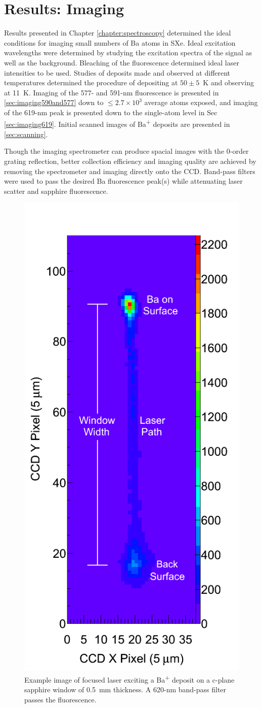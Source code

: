 \chapter{Results: Imaging}
\label{chapter:imaging}


Results presented in Chapter \ref{chapter:spectroscopy} determined the ideal conditions for imaging small numbers of Ba atoms in SXe.  Ideal excitation wavelengths were determined by studying the excitation spectra of the signal as well as the background.  Bleaching of the fluorescence determined ideal laser intensities to be used.  Studies of deposits made and observed at different temperatures determined the procedure of depositing at $50 \pm 5$~K and observing at 11~K.  Imaging of the 577- and 591-nm fluorescence is presented in \ref{sec:imaging590and577} down to $\leq 2.7 \times 10^{3}$ average atoms exposed, and imaging of the 619-nm peak is presented down to the single-atom level in Sec \ref{sec:imaging619}.  Initial scanned images of Ba\textsuperscript{+} deposits are presented in \ref{sec:scanning}.

Though the imaging spectrometer can produce spacial images with the 0-order grating reflection, better collection efficiency and imaging quality are achieved by removing the spectrometer and imaging directly onto the CCD.  Band-pass filters were used to pass the desired Ba fluorescence peak(s) while attenuating laser scatter and sapphire fluorescence.

\begin{figure} %
        \centering
                \includegraphics[width=.4\textwidth]{figures/imageExamp.png}
                \caption{Example image of focused laser exciting a Ba\textsuperscript{+} deposit on a c-plane sapphire window of 0.5~mm thickness.  A 620-nm band-pass filter passes the fluorescence.}
\label{fig:imageexamp}
\end{figure}

